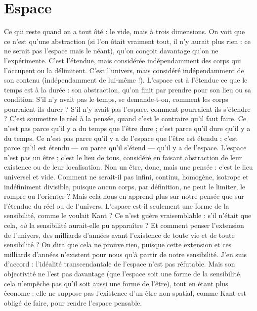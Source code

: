 \section{Espace}
Ce qui reste quand on a tout ôté : le vide, mais à trois dimensions.
On voit que ce n’est qu’une abstraction (si l’on ôtait vraiment tout,
il n’y aurait plus rien : ce ne serait pas l’espace mais le néant), qu’on conçoit
davantage qu’on ne l’expérimente. C’est l'étendue, mais considérée indépendamment
des corps qui l’occupent ou la délimitent. C’est l’univers, mais considéré
indépendamment de son contenu (indépendamment de lui-même !).
L'espace est à l’étendue ce que le temps est à la durée : son abstraction,
qu'on finit par prendre pour son lieu ou sa condition. S'il n’y avait pas le
temps, se demande-t-on, comment les corps pourraient-ils durer ? S’il n’y avait
pas l’espace, comment pourraient-ils s'étendre ? C’est soumettre le réel à la
pensée, quand c’est le contraire qu’il faut faire. Ce n’est pas parce qu’il y a du
temps que l'être dure ; c’est parce qu’il dure qu’il y a du temps. Ce n’est pas
parce qu'il y a de l’espace que l’être est étendu ; c’est parce qu’il est étendu — ou
parce qu'il s’étend — qu’il y a de l’espace. L'espace n’est pas un être ; c’est le lieu
de tous, considéré en faisant abstraction de leur existence ou de leur localisation.
Non un être, donc, mais une pensée : c’est le lieu universel et vide. Comment
ne serait-il pas infini, continu, homogène, isotrope et indéfiniment divisible,
puisque aucun corps, par définition, ne peut le limiter, le rompre ou
l’orienter ? Mais cela nous en apprend plus sur notre pensée que sur l'étendue
du réel ou de l’univers.
L'espace est-il seulement une forme de la sensibilité, comme le voulait
Kant ? Ce n’est guère vraisemblable : s’il n’était que cela, {\it où} la sensibilité aurait-elle
pu apparaître ? Et comment penser l’extension de l’univers, des milliards
d’années avant l'existence de toute vie et de toute sensibilité ? On dira que cela
ne prouve rien, puisque cette extension et ces milliards d’années n’existent pour
nous qu’à partir de notre sensibilité. J’en suis d’accord : l’idéalité transcendantale
de l’espace n’est pas réfutable. Mais son objectivité ne l’est pas davantage
(que l’espace soit une forme de la sensibilité, cela n’empêche pas qu’il soit aussi
une forme de l’être), tout en étant plus économe : elle ne suppose pas l'existence
d’un être non spatial, comme Kant est obligé de faire, pour rendre
l’espace pensable.

